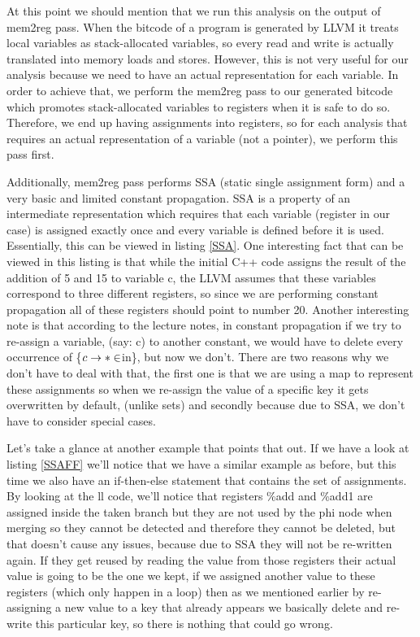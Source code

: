 At this point we should mention that we run this analysis on the output of mem2reg pass. When the bitcode of a program is generated by LLVM it  treats local variables as stack-allocated variables, so every read and write is actually translated into memory loads and stores. However, this is not very useful for our analysis because we need to have an actual representation for each variable. In order to achieve that, we perform the mem2reg pass to our generated bitcode which promotes stack-allocated variables to registers when it is safe to do so. Therefore, we end up having assignments into registers, so for each analysis that requires an actual representation of a variable (not a pointer), we perform this pass first. 

Additionally, mem2reg pass performs SSA (static single assignment form) and a very basic and limited constant propagation. SSA is a property of an intermediate representation which requires that each variable (register in our case) is assigned exactly once and every variable is defined before it is used. Essentially, this can be viewed in listing \ref{SSA}. One interesting fact that can be viewed in this listing is that while the initial C++ code assigns the result of the addition of 5 and 15 to variable c, the LLVM assumes that these variables correspond to three different registers, so since we are performing constant propagation all of these registers should point to number 20. Another interesting note is that according to the lecture notes, in constant propagation if we try to re-assign a variable, (say: c) to another constant, we would have to delete every occurrence of \{$c\rightarrow* \in$in\}, but now we don't. There are two reasons why we don't have to deal with that, the first one is that we are using a map to represent these assignments so when we re-assign the value of a specific key it gets overwritten by default, (unlike sets) and secondly because due to SSA, we don't have to consider special cases. 


Let's take a glance at another example that points that out. If we have a look at listing \ref{SSAFF} we'll notice that we have a similar example as before, but this time we also have an if-then-else statement that contains the set of assignments. By looking at the ll code, we'll notice that registers \%add and \%add1 are assigned inside the taken branch but they are not used by the phi node when merging so they cannot be detected and therefore they cannot be deleted, but that doesn't cause any issues, because due to SSA they will not be re-written again. If they get reused by reading the value from those registers their actual value is going to be the one we kept, if we assigned another value to these registers (which only happen in a loop) then as we mentioned earlier by re-assigning a new value to a key that already appears we basically delete and re-write this particular key, so there is nothing that could go wrong.

